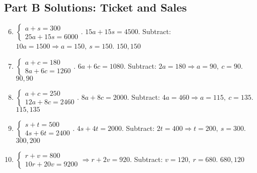 \documentclass[12pt]{article}
\begin{document}
\subsection*{Part B Solutions: Ticket and Sales}
\begin{enumerate}
  \setcounter{enumi}{5}
  \item \(\begin{cases} a+s=300 \\ 25a+15s=6000 \end{cases}\).  
  \(15a+15s=4500\). Subtract: \(10a=1500 \Rightarrow a=150,\ s=150\). \(\boxed{150,150}\)

  \item \(\begin{cases} a+c=180 \\ 8a+6c=1260 \end{cases}\).  
  \(6a+6c=1080\). Subtract: \(2a=180 \Rightarrow a=90,\ c=90\). \(\boxed{90,90}\)

  \item \(\begin{cases} a+c=250 \\ 12a+8c=2460 \end{cases}\).  
  \(8a+8c=2000\). Subtract: \(4a=460 \Rightarrow a=115,\ c=135\). \(\boxed{115,135}\)

  \item \(\begin{cases} s+t=500 \\ 4s+6t=2400 \end{cases}\).  
  \(4s+4t=2000\). Subtract: \(2t=400 \Rightarrow t=200,\ s=300\). \(\boxed{300,200}\)

  \item \(\begin{cases} r+v=800 \\ 10r+20v=9200 \end{cases}\Rightarrow r+2v=920\).  
  Subtract: \(v=120,\ r=680\). \(\boxed{680,120}\)
\end{enumerate}
\end{document}
